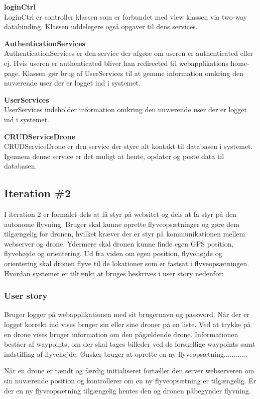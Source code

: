 \textbf{loginCtrl} \\
LoginCtrl er controller klassen som er forbundet med view klassen via two-way databinding. Klassen uddelegere også opgaver til dens services.

\textbf{AuthenticationServices} \\
AuthenticationServices er den service der afgøre om useren er authenticated eller ej. Hvis useren er authenticated bliver han redirected til webapplikations home-page. Klassen gør brug af UserServices til at gemme information omkring den nuværende user der er logget ind i systemet.

\textbf{UserServices}\\
UserServices indeholder information omkring den nuværende user der er logget ind i systemet.

\textbf{CRUDServiceDrone} \\
CRUDServiceDrone er den service der styre alt kontakt til databasen i systemet. Igennem denne service er det muligt at hente, opdater og poste data til databasen.


\newpage

\subsection{Iteration \#2}
I iteration 2 er formålet dels at få styr på websitet og dels at få styr på den autonome flyvning. Bruger skal kunne oprette flyveopsætninger og gøre dem tilgængelig for dronen, hvilket kræver der er styr på kommunikationen mellem webserver og drone. Ydermere skal dronen kunne finde egen GPS position, flyvehøjde og orientering. Ud fra viden om egen position, flyvehøjde og orientering skal dronen flyve til de lokationer som er fastsat i flyveopsætningen. 
Hvordan systemet er tiltænkt at bruges beskrives i user story nedenfor:

\subsubsection*{User story}
Bruger logger på webapplikationen med sit brugernavn og password. Når der er logget korrekt ind vises bruger sin eller sine droner på en liste. Ved at trykke på en drone vises bruger information om den pågældende drone. Informationen beståer af waypoints, om der skal tages billeder ved de forskellige waypoints samt indstilling af flyvehøjde. Ønsker bruger at oprette en ny flyveopsætning............

Når en drone er tændt og færdig initialiseret fortæller den server webserveren om sin nuværende position og kontrollerer om en ny flyveopsætning er tilgængelig. Er der en ny flyveopsætning tilgængelig hentes den og dronen påbegynder flyvning.

